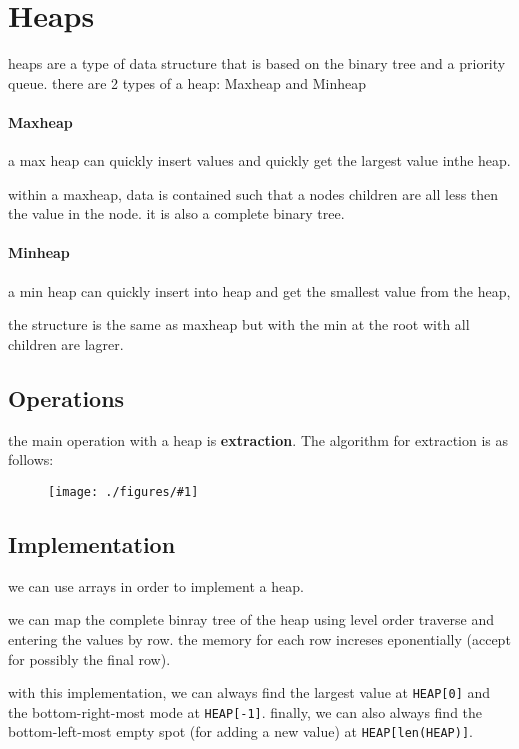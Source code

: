 \documentclass[12pt]{book}
\title{\coursetitle\linebreak\lecturename}
\author{\\Cain Susko\\ 
           \\ \\ \\
      Queen's University 
    \\School of Computing\\}
\newcommand{\incimg}[2]{%
       \begin{figure}[h]
               \centering
               \texttt{[image: ./figures/\#1]}
       \end{figure}
}
\begin{document}
\begin{titlepage}
        \maketitle
\end{titlepage}


\section*{Heaps}
heaps are a type of data structure that is based on the binary tree and a priority queue. there are 2
types of a heap: Maxheap and Minheap

\paragraph{Maxheap}
a max heap can quickly insert values and quickly get the largest value inthe heap.

within a maxheap, data is contained such that a nodes children are all less then the value in the node. it is also a complete binary tree.

\paragraph{Minheap}
a min heap can quickly insert into heap and get the smallest value from the heap,

the structure is the same as maxheap but with the min at the root with all children are lagrer.

\subsection*{Operations}
the main operation with a heap is \textbf{extraction}. The algorithm for extraction is as follows:
\incimg{extract}{0.5}

\subsection*{Implementation}
we can use arrays in order to implement a heap.

we can map the complete binray tree of the heap using level order traverse and entering the values by row. the memory for each row increses eponentially
(accept for possibly the final row).

with this implementation, we can always find the largest value at \texttt{HEAP[0]} and the bottom-right-most mode at \texttt{HEAP[-1]}.
finally, we can also always find the bottom-left-most empty spot (for adding a new value) at \texttt{HEAP[len(HEAP)]}.
\end{document}

